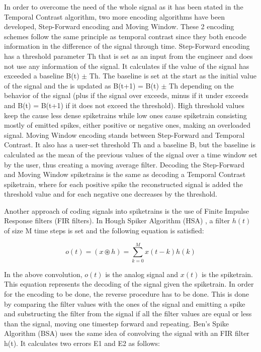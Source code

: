 \documentclass[12pt]{report}
\begin{document}
In order to overcome the need of the whole signal as it has been stated in the Temporal Contrast algorithm, two more encoding algorithms have been developed, Step-Forward encoding and Moving Window. These 2 encoding schemes follow the same principle as temporal contrast since they both encode information in the difference of the signal through time. Step-Forward encoding has a threshold parameter Th that is set as an input from the engineer and does not use any information of the signal. It calculates if the value of the signal has exceeded a baseline B(t) \(\pm\) Th. The baseline is set at the start as the initial value of the signal and the is updated as B(t+1) = B(t) \(\pm\) Th depending on the behavior of the signal (plus if the signal over exceeds, minus if it under exceeds and B(t) = B(t+1) if it does not exceed the threshold). High threshold values keep the cause less dense spiketrains while low ones cause spiketrain consisting mostly of emitted spikes, either positive or negative ones, making an overloaded signal. Moving Window encoding stands between Step-Forward and Temporal Contrast. It also has a user-set threshold Th and a baseline B, but the baseline is calculated as the mean of the previous values of the signal over a time window set by the user, thus creating a moving average filter. Decoding the Step-Forward and Moving Window spiketrains is the same as decoding a Temporal Contrast spiketrain, where for each positive spike the reconstructed signal is added the threshold value and for each negative one decreases by the threshold.

Another approach of coding signals into spiketrains is the use of Finite Impulse Response filters (FIR filters). In Hough Spiker Algorithm  (HSA) \cite{Gers1999}, a filter \(h(t)\) of size M time steps is set and the following equation is satisfied: 

\begin{equation}
    o(t)=(x\circledast h)=\sum_{k=0}^{M}x(t-k)h(k)
\end{equation}

In the above convolution, \(o(t)\) is the analog signal and \(x(t)\) is the spiketrain. This equation represents the decoding of the signal given the spiketrain. In order for the encoding to be done, the reverse procedure has to be done. This is done by comparing the filter values with the ones of the signal and emitting a spike and substructing the filter from the signal if all the filter values are equal or less than the signal, moving one timestep forward and repeating. Ben's Spike Algorithm (BSA) \cite{Schrauwen2003} uses the same idea of convolving the signal with an FIR filter h(t). It calculates two errors E1 and E2 as follows:
\end{document}
